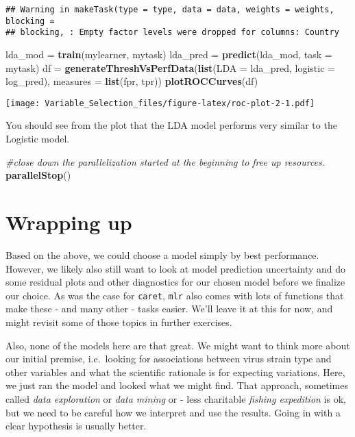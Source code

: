 \documentclass[]{article}
\newenvironment{Shaded}{\begin{snugshade}}{\end{snugshade}}
\newcommand{\CommentTok}[1]{\textcolor[rgb]{0.56,0.35,0.01}{\textit{#1}}}
\newcommand{\DataTypeTok}[1]{\textcolor[rgb]{0.13,0.29,0.53}{#1}}
\newcommand{\KeywordTok}[1]{\textcolor[rgb]{0.13,0.29,0.53}{\textbf{#1}}}
\newcommand{\NormalTok}[1]{#1}
\newcommand{\StringTok}[1]{\textcolor[rgb]{0.31,0.60,0.02}{#1}}
\begin{document}
\begin{verbatim}
## Warning in makeTask(type = type, data = data, weights = weights, blocking =
## blocking, : Empty factor levels were dropped for columns: Country
\end{verbatim}

\begin{Shaded}
\begin{Highlighting}[]
\NormalTok{lda_mod =}\StringTok{ }\KeywordTok{train}\NormalTok{(mylearner, mytask)}
\NormalTok{lda_pred =}\StringTok{ }\KeywordTok{predict}\NormalTok{(lda_mod, }\DataTypeTok{task =}\NormalTok{ mytask)}
\NormalTok{df =}\StringTok{ }\KeywordTok{generateThreshVsPerfData}\NormalTok{(}\KeywordTok{list}\NormalTok{(}\DataTypeTok{LDA =}\NormalTok{ lda_pred, }\DataTypeTok{logistic =}\NormalTok{ log_pred), }\DataTypeTok{measures =} \KeywordTok{list}\NormalTok{(fpr, tpr))}
\KeywordTok{plotROCCurves}\NormalTok{(df)}
\end{Highlighting}
\end{Shaded}

\texttt{[image: Variable\_Selection\_files/figure-latex/roc-plot-2-1.pdf]}

You should see from the plot that the LDA model performs very similar to
the Logistic model.

\begin{Shaded}
\begin{Highlighting}[]
\CommentTok{#close down the parallelization started at the beginning to free up resources.}
\KeywordTok{parallelStop}\NormalTok{()}
\end{Highlighting}
\end{Shaded}

\hypertarget{wrapping-up}{%
\section{Wrapping up}\label{wrapping-up}}

Based on the above, we could choose a model simply by best performance.
However, we likely also still want to look at model prediction
uncertainty and do some residual plots and other diagnostics for our
chosen model before we finalize our choice. As was the case for
\texttt{caret}, \texttt{mlr} also comes with lots of functions that make
these - and many other - tasks easier. We'll leave it at this for now,
and might revisit some of those topics in further exercises.

Also, none of the models here are that great. We might want to think
more about our initial premise, i.e.~looking for associations between
virus strain type and other variables and what the scientific rationale
is for expecting variations. Here, we just ran the model and looked what
we might find. That approach, sometimes called \emph{data exploration}
or \emph{data mining} or - less charitable \emph{fishing expedition} is
ok, but we need to be careful how we interpret and use the results.
Going in with a clear hypothesis is usually better.
\end{document}
